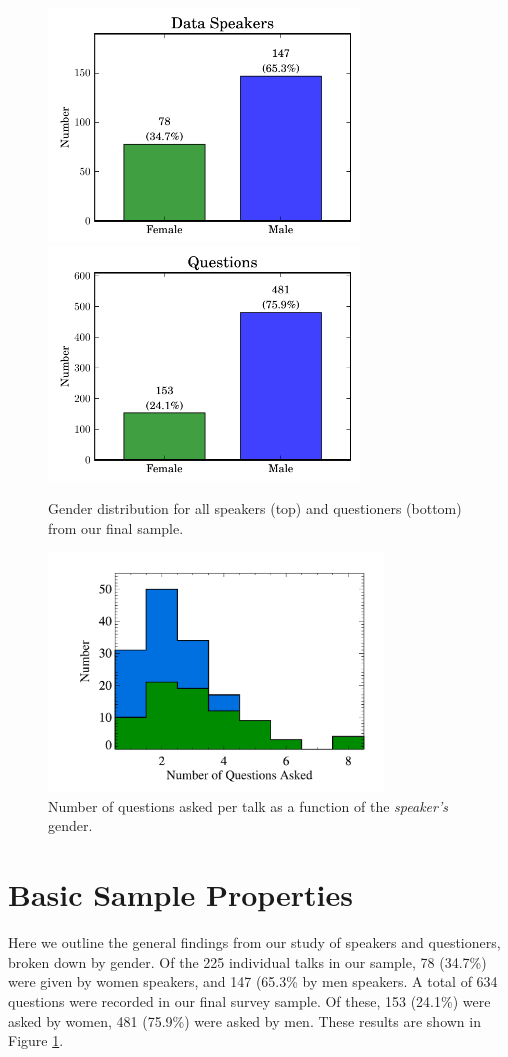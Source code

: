 \documentclass[iop]{emulateapj}
\begin{document}
\begin{figure}[!t]
\centering
\includegraphics[width=3.25in]{speakers_data}
\includegraphics[width=3.25in]{questions}
\caption{Gender distribution for all speakers (top) and questioners (bottom) from our final sample.}
\label{fig:q}
\end{figure}

\begin{figure}[!t]
\centering
\includegraphics[width=3.5in]{n_question_gender}
\caption{Number of questions asked per talk as a function of the {\it speaker's} gender.}
\label{fig:qhist}
\end{figure}


\section{Basic Sample Properties}
Here we outline the general findings from our study of speakers and questioners, broken down by gender.  
Of the 225 individual talks in our sample, 78 (34.7\%) were given by women speakers, and 147 (65.3\% by men speakers. A total of 634 questions were recorded in our final survey sample. Of these, 153 (24.1\%) were asked by women, 481 (75.9\%) were asked by men. These results are shown in Figure \ref{fig:q}.
\end{document}
